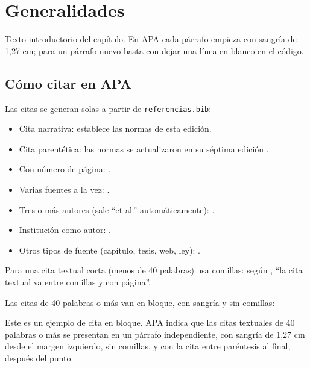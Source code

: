 
\chapter{Generalidades}

Texto introductorio del capítulo. En APA cada párrafo empieza con sangría de 1,27 cm; para un párrafo nuevo basta con dejar una línea en blanco en el código. \lipsum[1]


\section{Cómo citar en APA}

Las citas se generan solas a partir de \texttt{referencias.bib}:

\begin{itemize}
\item Cita narrativa: \textcite{apa2020} establece las normas de esta edición.
\item Cita parentética: las normas se actualizaron en su séptima edición \parencite{apa2020}.
\item Con número de página: \parencite[p.~45]{apellido2023}.
\item Varias fuentes a la vez: \parencite{apellido2023,autor2024}.
\item Tres o más autores (sale \enquote{et al.} automáticamente): \textcite{autor2024}.
\item Institución como autor: \parencite{dane2024}.
\item Otros tipos de fuente (capítulo, tesis, web, ley): \parencite{capitulo2022,tesis2021,web2025,ley617}.
\end{itemize}

Para una cita textual corta (menos de 40 palabras) usa comillas: según \textcite[p.~12]{apellido2023}, \enquote{la cita textual va entre comillas y con página}.

Las citas de 40 palabras o más van en bloque, con sangría y sin comillas:

\begin{citalarga}
Este es un ejemplo de cita en bloque. APA indica que las citas textuales de 40 palabras o más se presentan en un párrafo independiente, con sangría de 1,27 cm desde el margen izquierdo, sin comillas, y con la cita entre paréntesis al final, después del punto. \parencite[p.~171]{apa2020}
\end{citalarga}

